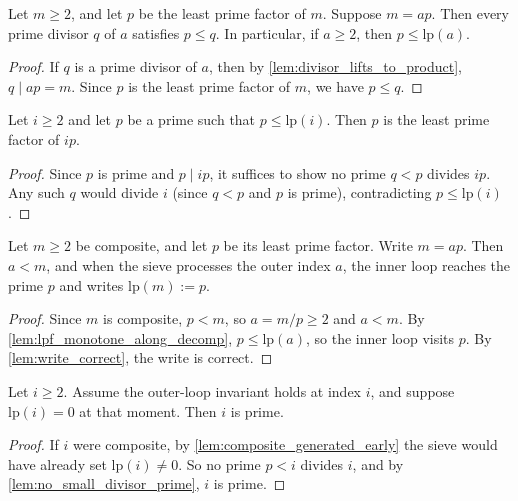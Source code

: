 \begin{lemma}
    \label{lem:lpf_monotone_along_decomp}
    Let $m\ge 2$, and let $p$ be the least prime factor of $m$.
    Suppose $m=ap$.
    Then every prime divisor $q$ of $a$ satisfies $p\le q$.
    In particular, if $a\ge 2$, then $p \le \mathrm{lp}(a)$.
\end{lemma}
\begin{proof}
    If $q$ is a prime divisor of $a$, then by \ref{lem:divisor_lifts_to_product}, $q \mid ap = m$. Since $p$ is the least prime factor of $m$, we have $p \le q$.
\end{proof}

\begin{lemma}
    \label{lem:write_correct}
    Let $i\ge 2$ and let $p$ be a prime such that $p \le \mathrm{lp}(i)$.
    Then $p$ is the least prime factor of $ip$.
\end{lemma}
\begin{proof}
    Since $p$ is prime and $p \mid ip$, it suffices to show no prime $q < p$ divides $ip$. Any such $q$ would divide $i$ (since $q < p$ and $p$ is prime), contradicting $p \le \mathrm{lp}(i)$.
\end{proof}

\begin{lemma}
    \label{lem:composite_generated_early}
    Let $m\ge 2$ be composite, and let $p$ be its least prime factor.
    Write $m = ap$.
    Then $a < m$, and when the sieve processes the outer index $a$, the inner loop reaches the prime $p$ and writes $\mathrm{lp}(m):=p$.
\end{lemma}
\begin{proof}
    Since $m$ is composite, $p < m$, so $a = m/p \ge 2$ and $a < m$. By \ref{lem:lpf_monotone_along_decomp}, $p \le \mathrm{lp}(a)$, so the inner loop visits $p$. By \ref{lem:write_correct}, the write is correct.
\end{proof}

\begin{lemma}[If $\mathrm{lp}(i)=0$, then $i$ is prime]
    \label{lem:lp_zero_implies_prime}
    Let $i\ge 2$.
    Assume the outer-loop invariant holds at index $i$, and suppose $\mathrm{lp}(i)=0$ at that moment.
    Then $i$ is prime.
\end{lemma}
\begin{proof}
    If $i$ were composite, by \ref{lem:composite_generated_early} the sieve would have already set $\mathrm{lp}(i) \ne 0$. So no prime $p < i$ divides $i$, and by \ref{lem:no_small_divisor_prime}, $i$ is prime.
\end{proof}

